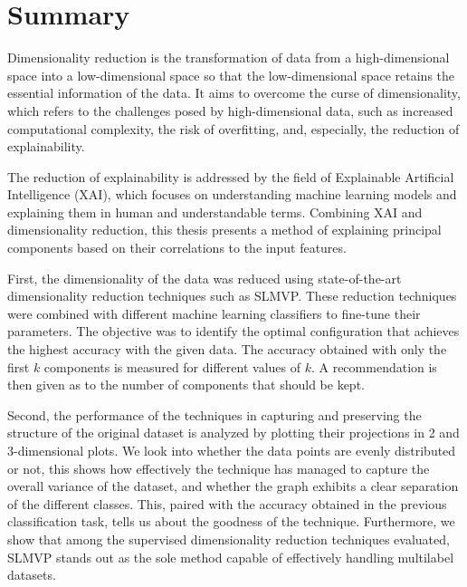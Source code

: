 \chapter*{Summary}

Dimensionality reduction is the transformation of data from a high-dimensional space into a low-dimensional space so that the low-dimensional space retains the essential information of the data. It aims to overcome the curse of dimensionality, which refers to the challenges posed by high-dimensional data, such as increased computational complexity, the risk of overfitting, and, especially, the reduction of explainability.

The reduction of explainability is addressed by the field of Explainable Artificial Intelligence (XAI), which focuses on understanding machine learning models and explaining them in human and understandable terms. Combining XAI and dimensionality reduction, this thesis presents a method of explaining principal components based on their correlations to the input features.

First, the dimensionality of the data was reduced using state-of-the-art dimensionality reduction techniques such as SLMVP. These reduction techniques were combined with different machine learning classifiers to fine-tune their parameters. The objective was to identify the optimal configuration that achieves the highest accuracy with the given data.
The accuracy obtained with only the first $k$ components is measured for different values of $k$. A recommendation is then given as to the number of components that should be kept.

Second, the performance of the techniques in capturing and preserving the structure of the original dataset is analyzed by plotting their projections in 2 and 3-dimensional plots. We look into whether the data points are evenly distributed or not, this shows how effectively the technique has managed to capture the overall variance of the dataset, and whether the graph exhibits a clear separation of the different classes. This, paired with the accuracy obtained in the previous classification task, tells us about the goodness of the technique.
Furthermore, we show that among the supervised dimensionality reduction techniques evaluated, SLMVP stands out as the sole method capable of effectively handling multilabel datasets.

